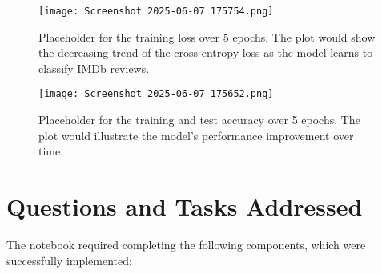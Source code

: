 \documentclass{article}
\begin{document}

\begin{figure}[h]
    \centering
    \texttt{[image: Screenshot 2025-06-07 175754.png]}
    \caption{Placeholder for the training loss over 5 epochs. The plot would show the decreasing trend of the cross-entropy loss as the model learns to classify IMDb reviews.}
    \label{fig:loss_plot}
\end{figure}

\begin{figure}[h]
    \centering
    \texttt{[image: Screenshot 2025-06-07 175652.png]}
    \caption{Placeholder for the training and test accuracy over 5 epochs. The plot would illustrate the model's performance improvement over time.}
    \label{fig:accuracy_plot}
\end{figure}

\section{Questions and Tasks Addressed}
The notebook required completing the following components, which were successfully implemented:
\end{document}
